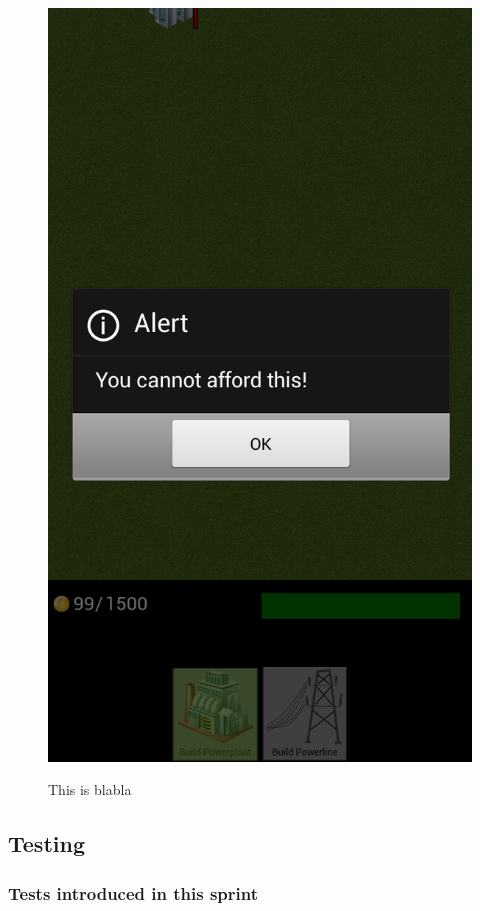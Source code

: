 \begin{figure}[H]
{		\includegraphics[scale=0.17]{pictures/sprint2-screen/sprint2-11}
	}
	\caption{This is blabla}
	\end{figure}

\clearpage
\subsection{Testing}

	\subsubsection{Tests introduced in this sprint}

